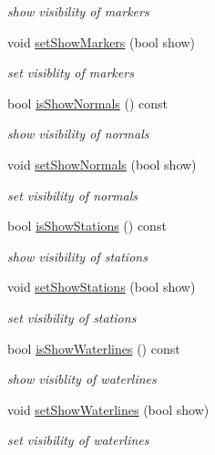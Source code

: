 \begin{DoxyCompactItemize}
\begin{DoxyCompactList}\small\item\em show visibility of markers \end{DoxyCompactList}\item 
void \hyperlink{classShipCAD_1_1Visibility_a04cd6f732b4334070aef1f43b457d472}{set\-Show\-Markers} (bool show)
\begin{DoxyCompactList}\small\item\em set visiblity of markers \end{DoxyCompactList}\item 
bool \hyperlink{classShipCAD_1_1Visibility_a973f63d7828898c1499607a8d87b430d}{is\-Show\-Normals} () const 
\begin{DoxyCompactList}\small\item\em show visibility of normals \end{DoxyCompactList}\item 
void \hyperlink{classShipCAD_1_1Visibility_a78971bef725cdc53fa600589d68b628a}{set\-Show\-Normals} (bool show)
\begin{DoxyCompactList}\small\item\em set visibility of normals \end{DoxyCompactList}\item 
bool \hyperlink{classShipCAD_1_1Visibility_a02ae626d57305729ff870e14dd7f6e26}{is\-Show\-Stations} () const 
\begin{DoxyCompactList}\small\item\em show visibility of stations \end{DoxyCompactList}\item 
void \hyperlink{classShipCAD_1_1Visibility_a41a2754fcdbe69609b837fc9be26135e}{set\-Show\-Stations} (bool show)
\begin{DoxyCompactList}\small\item\em set visibility of stations \end{DoxyCompactList}\item 
bool \hyperlink{classShipCAD_1_1Visibility_a5ada95979a3d66b792b394f7c065b1fd}{is\-Show\-Waterlines} () const 
\begin{DoxyCompactList}\small\item\em show visiblity of waterlines \end{DoxyCompactList}\item 
void \hyperlink{classShipCAD_1_1Visibility_ac07b5944afd8a44c569aef09ee893450}{set\-Show\-Waterlines} (bool show)
\begin{DoxyCompactList}\small\item\em set visibility of waterlines \end{DoxyCompactList}\item 

\end{DoxyCompactItemize}
